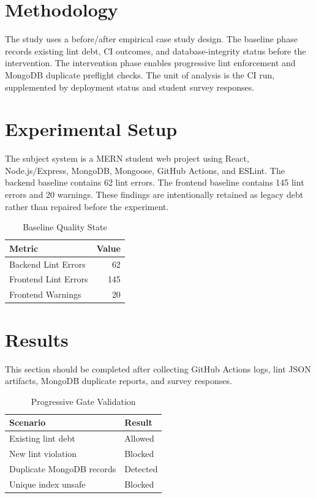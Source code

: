 \documentclass[conference]{IEEEtran}
\begin{document}
\section{Methodology}
The study uses a before/after empirical case study design. The baseline phase records existing lint debt, CI outcomes, and database-integrity status before the intervention. The intervention phase enables progressive lint enforcement and MongoDB duplicate preflight checks. The unit of analysis is the CI run, supplemented by deployment status and student survey responses.

\section{Experimental Setup}
The subject system is a MERN student web project using React, Node.js/Express, MongoDB, Mongoose, GitHub Actions, and ESLint. The backend baseline contains 62 lint errors. The frontend baseline contains 145 lint errors and 20 warnings. These findings are intentionally retained as legacy debt rather than repaired before the experiment.

\begin{table}[htbp]
\caption{Baseline Quality State}
\centering
\begin{tabular}{lr}
\toprule
Metric & Value \\
\midrule
Backend Lint Errors & 62 \\
Frontend Lint Errors & 145 \\
Frontend Warnings & 20 \\
\bottomrule
\end{tabular}
\end{table}

\section{Results}
This section should be completed after collecting GitHub Actions logs, lint JSON artifacts, MongoDB duplicate reports, and survey responses.

\begin{table}[htbp]
\caption{Progressive Gate Validation}
\centering
\begin{tabular}{ll}
\toprule
Scenario & Result \\
\midrule
Existing lint debt & Allowed \\
New lint violation & Blocked \\
Duplicate MongoDB records & Detected \\
Unique index unsafe & Blocked \\
\bottomrule
\end{tabular}
\end{table}
\end{document}
